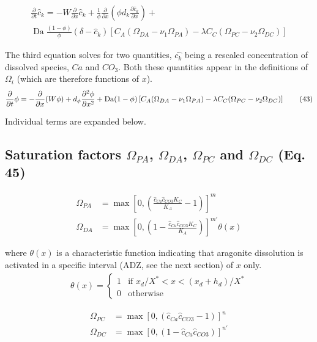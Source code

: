 \documentclass[10pt, letterpaper]{article}
\begin{document}
\begin{align*}
   \frac{\partial}{\partial t} \hat{c}_k = -W \frac{\partial}{\partial x} \hat{c}_k + \frac{1}{\phi} \frac{\partial}{\partial x} \left(\phi d_k \frac{\partial\hat{c}_k}{\partial x}\right )+ \\
   \operatorname{Da} \frac{(1 - \phi)}{\phi} (\delta - \hat{c}_k) \left[C_A (\Omega_{DA} - \nu_1 \Omega_{PA}) - \lambda C_C (\Omega_{PC} - \nu_2 \Omega_{DC})\right] \tag{42}
\end{align*}


The third equation solves for two quantities, $\hat{c_k}$ being a rescaled concentration of dissolved species, $Ca$ and $CO_3$. Both these quantities appear in the definitions of $\Omega_i$ (which are therefore functions of $x$).
\begin{equation}
\frac{\partial}{\partial t} \phi = - \frac{\partial}{\partial x}(W\phi) + d_{\phi} \frac{\partial^2\phi}{\partial x^2} + \operatorname{Da}(1 - \phi) \left[C_A(\Omega_{DA} - \nu_1\Omega_{PA}) - \\\lambda C_C(\Omega_{PC} - \nu_2\Omega_{DC})\right] \tag{43}
\end{equation}

Individual terms are expanded below.

\subsection{Saturation factors $\Omega_{PA}$, $\Omega_{DA}$, $\Omega_{PC}$ and $\Omega_{DC}$ (Eq. 45)} 

\begin{align}
\Omega_{PA} &= \max\left[0, \left(\frac{\hat{c}_{Ca} \hat{c}_{CO3} K_C}{K_A} - 1 \right)\right]^m \nonumber \\
\Omega_{DA} &= \max\left[0, \left(1 - \frac{\hat{c}_{Ca} \hat{c}_{CO3} K_C}{K_A} \right)\right] ^{m'} \theta(x) \nonumber 
\end{align}

where $\theta(x)$ is a characteristic function indicating that aragonite dissolution is activated in a specific interval (ADZ, see the next section) of $x$ only. 
\begin{align}
\theta(x) = \begin{cases}
    1  &\mbox{if } x_d/X^* < x < (x_d + h_d)/X^* \\
    0 &\text{otherwise}
\end{cases}
\end{align}

\begin{align}
\Omega_{PC} &= \max\left[0, (\hat{c}_{Ca} \hat{c}_{CO3}  - 1 )\right] ^n \nonumber \\
\Omega_{DC} &= \max\left[0, (1 - \hat{c}_{Ca} \hat{c}_{CO3})\right]^{n'} \nonumber
\end{align}
\end{document}
